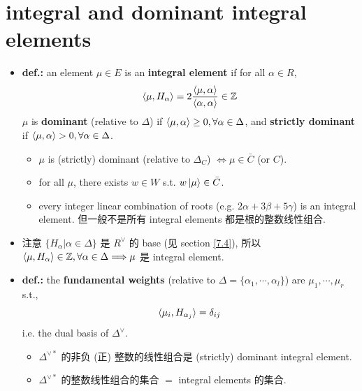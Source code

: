\section{integral and dominant integral elements}
\begin{itemize}
	\item \textbf{def.:} an element $\mu \in E$ is an \textbf{integral element} if for all $\alpha \in R$,
	\begin{equation}
		\braket{\mu, H_\alpha} = 2 \frac{\braket{\mu, \alpha}}{\braket{\alpha, \alpha}} \in \mathbb{Z}
	\end{equation}
	$\mu$ is \textbf{dominant} (relative to $\Delta$) if $\braket{\mu, \alpha} \geq 0, \forall \alpha \in \Delta$, and \textbf{strictly dominant} if $\braket{\mu, \alpha} > 0, \forall \alpha \in \Delta$.
	\begin{itemize}
		\item $\mu$ is (strictly) dominant (relative to $\Delta_C$) $\iff \mu \in \bar{C}$ (or $C$).
		
		\item for all $\mu$, there exists $w \in W$ s.t. $w \ket{\mu} \in \bar{C}$.
		
		\item every integer linear combination of roots (e.g. $2 \alpha + 3 \beta + 5 \gamma$) is an integral element. 但一般不是所有 integral elements 都是根的整数线性组合.
	\end{itemize}
	
	\item 注意 $\{H_\alpha | \alpha \in \Delta\}$ 是 $R^\vee$ 的 base (见 section \ref{7.4}), 所以 $\braket{\mu, H_\alpha} \in \mathbb{Z}, \forall \alpha \in \Delta \Longrightarrow \mu$ 是 integral element.
	
	\item \textbf{def.:} the \textbf{fundamental weights} (relative to $\Delta = \{\alpha_1, \cdots, \alpha_l\}$) are $\mu_1, \cdots, \mu_r$ s.t.,
	\begin{equation}
		\braket{\mu_i, H_{\alpha_j}} = \delta_{i j}
	\end{equation}
	i.e. the dual basis of $\Delta^\vee$.
	\begin{itemize}
		\item $\Delta^{\vee *}$ 的非负 (正) 整数的线性组合是 (strictly) dominant integral element.
		
		\item $\Delta^{\vee *}$ 的整数线性组合的集合 $=$ integral elements 的集合.
	\end{itemize}
	

\end{itemize}

